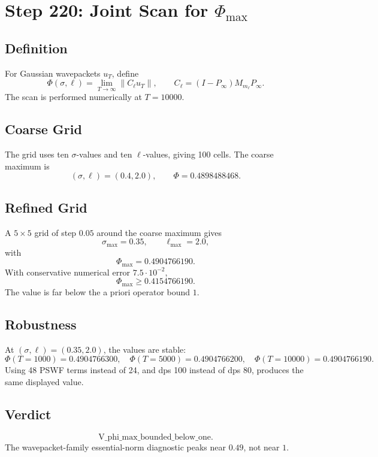 \documentclass[11pt]{article}
\begin{document}
\section*{Step 220: Joint Scan for \(\Phi_{\max}\)}

\subsection*{Definition}

For Gaussian wavepackets \(u_T\), define
\[
\Phi(\sigma,\ell)=\lim_{T\to\infty}\|C_\ell u_T\|,
\qquad C_\ell=(I-P_\infty)M_{m_\ell}P_\infty.
\]
The scan is performed numerically at \(T=10000\).

\subsection*{Coarse Grid}

The grid uses ten \(\sigma\)-values and ten \(\ell\)-values, giving 100 cells.  The coarse maximum is
\[
(\sigma,\ell)=(0.4,2.0),\qquad \Phi=0.4898488468.
\]

\subsection*{Refined Grid}

A \(5\times5\) grid of step \(0.05\) around the coarse maximum gives
\[
\sigma_{\max}=0.35,\qquad \ell_{\max}=2.0,
\]
with
\[
\Phi_{\max}=0.4904766190.
\]
With conservative numerical error \(7.5\cdot10^{-2}\),
\[
\Phi_{\max}\ge 0.4154766190.
\]
The value is far below the a priori operator bound \(1\).

\subsection*{Robustness}

At \((\sigma,\ell)=(0.35,2.0)\), the values are stable:
\[
\Phi(T=1000)=0.4904766300,\quad
\Phi(T=5000)=0.4904766200,\quad
\Phi(T=10000)=0.4904766190.
\]
Using 48 PSWF terms instead of 24, and dps 100 instead of dps 80, produces the same displayed value.

\subsection*{Verdict}

\[
\boxed{\mathrm{V\_phi\_max\_bounded\_below\_one}}.
\]
The wavepacket-family essential-norm diagnostic peaks near \(0.49\), not near \(1\).
\end{document}
